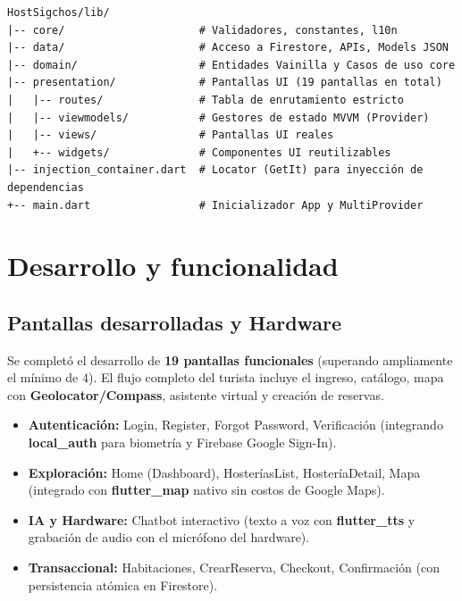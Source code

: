 \documentclass[12pt,letterpaper]{report}
\newcommand{\tech}[1]{\textbf{\textcolor{sigchosDarkGreen}{#1}}}
\begin{document}
\begin{tcolorbox}[colback=codeBack,colframe=codeFrame,boxrule=0.8pt,arc=6pt]
\begin{verbatim}
HostSigchos/lib/
|-- core/                     # Validadores, constantes, l10n
|-- data/                     # Acceso a Firestore, APIs, Models JSON
|-- domain/                   # Entidades Vainilla y Casos de uso core
|-- presentation/             # Pantallas UI (19 pantallas en total)
|   |-- routes/               # Tabla de enrutamiento estricto
|   |-- viewmodels/           # Gestores de estado MVVM (Provider)
|   |-- views/                # Pantallas UI reales
|   +-- widgets/              # Componentes UI reutilizables
|-- injection_container.dart  # Locator (GetIt) para inyección de dependencias
+-- main.dart                 # Inicializador App y MultiProvider
\end{verbatim}
\end{tcolorbox}

\chapter{Desarrollo y funcionalidad}

\section{Pantallas desarrolladas y Hardware}
Se completó el desarrollo de \textbf{19 pantallas funcionales} (superando ampliamente el mínimo de 4). El flujo completo del turista incluye el ingreso, catálogo, mapa con \tech{Geolocator/Compass}, asistente virtual y creación de reservas.

\begin{itemize}
    \item \textbf{Autenticación:} Login, Register, Forgot Password, Verificación (integrando \tech{local\_auth} para biometría y Firebase Google Sign-In).
    \item \textbf{Exploración:} Home (Dashboard), HosteríasList, HosteríaDetail, Mapa (integrado con \tech{flutter\_map} nativo sin costos de Google Maps).
    \item \textbf{IA y Hardware:} Chatbot interactivo (texto a voz con \tech{flutter\_tts} y grabación de audio con el micrófono del hardware).
    \item \textbf{Transaccional:} Habitaciones, CrearReserva, Checkout, Confirmación (con persistencia atómica en Firestore).
\end{itemize}
\end{document}
